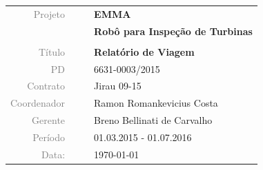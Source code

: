 \vspace{4cm}

\begin{table}[ht!]
	\centering
	\begin{tabular}{r l|l p{12cm} }
		\textcolor{gray}{Projeto} &&& \textbf{\Large EMMA}\\
			&&& \textbf{Robô para Inspeção de Turbinas}\\
			&&& \\
		\textcolor{gray}{Título} &&& \textbf{Relatório de Viagem}\\
		\textcolor{gray}{PD} &&& 6631-0003/2015 \\
		\textcolor{gray}{Contrato} &&& Jirau 09-15\\
		\textcolor{gray}{Coordenador} &&& Ramon Romankevicius Costa \\
		\textcolor{gray}{Gerente} &&& Breno Bellinati de Carvalho \\
		\textcolor{gray}{Período} &&& 01.03.2015 - 01.07.2016 \\
		\textcolor{gray}{Data:} &&& \today \\
	\end{tabular}
\end{table}


\cleardoublepage

